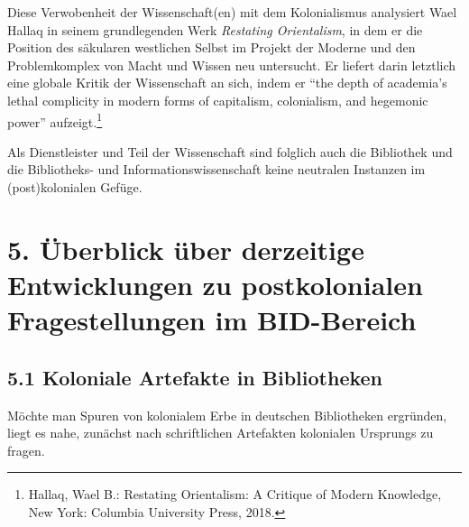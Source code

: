 \documentclass[a4paper,
fontsize=11pt,
oneside,
numbers=noperiodatend,
parskip=half-,
bibliography=totoc,
final
]{scrartcl}
\begin{document}
Diese Verwobenheit der Wissenschaft(en) mit dem Kolonialismus analysiert
Wael Hallaq in seinem grundlegenden Werk \emph{Restating Orientalism},
in dem er die Position des säkularen westlichen Selbst im Projekt der
Moderne und den Problemkomplex von Macht und Wissen neu untersucht. Er
liefert darin letztlich eine globale Kritik der Wissenschaft an sich,
indem er \enquote{the depth of academia's lethal complicity in modern
forms of capitalism, colonialism, and hegemonic power}
aufzeigt.\footnote{Hallaq, Wael B.: Restating Orientalism: A Critique of
  Modern Knowledge, New York: Columbia University Press, 2018.}

Als Dienstleister und Teil der Wissenschaft sind folglich auch die
Bibliothek und die Bibliotheks- und Informationswissenschaft keine
neutralen Instanzen im (post)kolonialen Gefüge.

\hypertarget{uxfcberblick-uxfcber-derzeitige-entwicklungen-zu-postkolonialen-fragestellungen-im-bid-bereich}{%
\section{5. Überblick über derzeitige Entwicklungen zu
postkolonialen Fragestellungen im
BID-Bereich}\label{uxfcberblick-uxfcber-derzeitige-entwicklungen-zu-postkolonialen-fragestellungen-im-bid-bereich}}

\hypertarget{koloniale-artefakte-in-bibliotheken}{%
\subsection{5.1 Koloniale Artefakte in
Bibliotheken}\label{koloniale-artefakte-in-bibliotheken}}

Möchte man Spuren von kolonialem Erbe in deutschen Bibliotheken
ergründen, liegt es nahe, zunächst nach schriftlichen Artefakten
kolonialen Ursprungs zu fragen.
\end{document}
